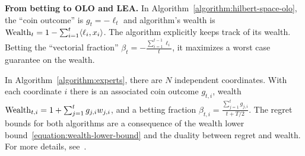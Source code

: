 \textbf{From betting to \ac{OLO} and \ac{LEA}.}
In Algorithm~\ref{algorithm:hilbert-space-olo}, the ``coin outcome'' is
$g_t = -\ell_t$ and algorithm's wealth is
$
\operatorname{Wealth}_t = 1 - \sum_{i=1}^t \langle \ell_i, x_i \rangle
$.
The algorithm explicitly keeps track of its wealth. Betting the ``vectorial fraction''
$\beta_t = - \tfrac{\sum_{i=1}^{t-1} \ell_i}{t}$, it maximizes a worst case guarantee on the wealth.

In Algorithm~\ref{algorithm:experts}, there are $N$ independent coordinates.
With each coordinate $i$ there is an associated coin outcome $g_{t,i}$, wealth
$\operatorname{Wealth}_{t,i} = 1 + \sum_{j=1}^t g_{j,i} w_{j,i}$, and a betting fraction
$\beta_{t,i} = \tfrac{\sum_{j=1}^t g_{j,i}}{t + T/2}$.
The regret bounds for both algorithms are a consequence of the wealth lower
bound~\eqref{equation:wealth-lower-bound} and the duality between regret and wealth.  For more details, see~\cite{Orabona-Pal-2016-parameter-free}.

